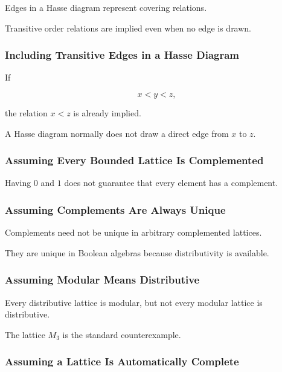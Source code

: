 Edges in a Hasse diagram represent covering relations.

Transitive order relations are implied even when no edge is drawn.

\subsubsection{Including Transitive Edges in a Hasse Diagram}

If

\[ x<y<z, \]

the relation \(x<z\) is already implied.

A Hasse diagram normally does not draw a direct edge from \(x\) to \(z\).

\subsubsection{Assuming Every Bounded Lattice Is Complemented}

Having \(0\) and \(1\) does not guarantee that every element has a
complement.

\subsubsection{Assuming Complements Are Always Unique}

Complements need not be unique in arbitrary complemented lattices.

They are unique in Boolean algebras because distributivity is available.

\subsubsection{Assuming Modular Means Distributive}

Every distributive lattice is modular, but not every modular lattice is
distributive.

The lattice \(M_3\) is the standard counterexample.

\subsubsection{Assuming a Lattice Is Automatically Complete}

